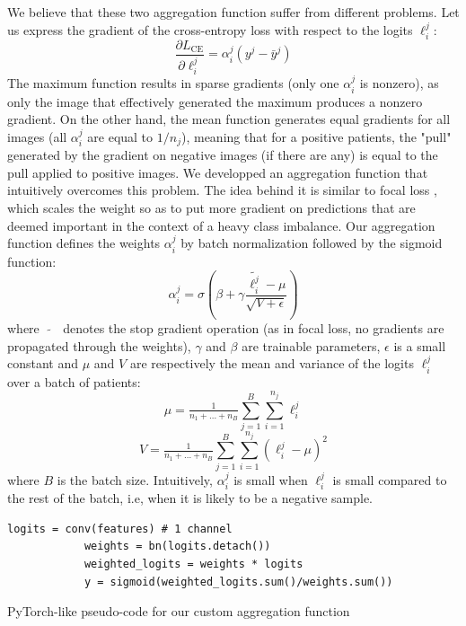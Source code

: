 \documentclass[final]{cvpr}
\begin{document}
	\vspace{1mm}
	\noindent
	We believe that these two aggregation function suffer from different problems. Let us express the gradient of the cross-entropy loss with respect to the logits $\ell_i^j$:
	$$\frac{\partial L_{\text{CE}}}{\partial \ell_i^j} = \alpha_i^j \left(y^j - \bar{y}^j\right)$$
	The maximum function results in sparse gradients (only one $\alpha_i^j$ is nonzero), as only the image that effectively generated the maximum produces a nonzero gradient. On the other hand, the mean function generates equal gradients for all images (all $\alpha_i^j$ are equal to $1/n_j$), meaning that for a positive patients, the "pull" generated by the gradient on negative images (if there are any) is equal to the pull applied to positive images. We developped an aggregation function that intuitively overcomes this problem.
	The idea behind it is similar to focal loss \cite{focal}, which scales the weight so as to put more gradient on predictions that are deemed important in the context of a heavy class imbalance.
	Our aggregation function defines the weights $\alpha_i^j$ by batch normalization \cite{bn} followed by the sigmoid function:
	$$ \alpha_i^j = \sigma\left(\beta + \gamma \frac{\widetilde{\ell_i^j} - \mu}{\sqrt{V+\epsilon}}\right) $$
	where $\; \widetilde{\text{ }} \;$ denotes the stop gradient operation (as in focal loss, no gradients are propagated through the weights), $\gamma$ and $\beta$ are trainable parameters, $\epsilon$ is a small constant and $\mu$ and $V$ are respectively the mean and variance of the logits $\ell_i^j$ over a batch of patients:
	$$\mu = \tfrac 1 {n_1+\dots+n_B} \sum_{j=1}^{B} \sum_{i=1}^{n_j} \ell_i^j$$
	$$V = \tfrac 1 {n_1+\dots+n_B} \sum_{j=1}^{B} \sum_{i=1}^{n_j} \left(\ell_i^j - \mu \right)^2$$
	where $B$ is the batch size. Intuitively, $\alpha_i^j$ is small when $\ell_i^j$ is small compared to the rest of the batch, i.e, when it is likely to be a negative sample.
	
	\begin{table}[h]
		\renewcommand\tablename{Pseudo-code}
		\begin{Verbatim}[fontsize=\footnotesize, samepage=true, frame=single]
			logits = conv(features) # 1 channel
			weights = bn(logits.detach())
			weighted_logits = weights * logits
			y = sigmoid(weighted_logits.sum()/weights.sum())
		\end{Verbatim}
		\caption{PyTorch-like pseudo-code for our custom aggregation function}
		\label{alg2}
	\end{table}
	
\end{document}
